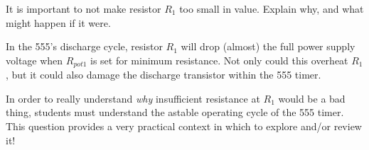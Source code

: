 

It is important to not make resistor $R_1$ too small in value.  Explain why, and what might happen if it were.







In the 555's discharge cycle, resistor $R_1$ will drop (almost) the full power supply voltage when $R_{pot1}$ is set for minimum resistance.  Not only could this overheat $R_1$, but it could also damage the discharge transistor within the 555 timer.







In order to really understand {\it why} insufficient resistance at $R_1$ would be a bad thing, students must understand the astable operating cycle of the 555 timer.  This question provides a very practical context in which to explore and/or review it!



